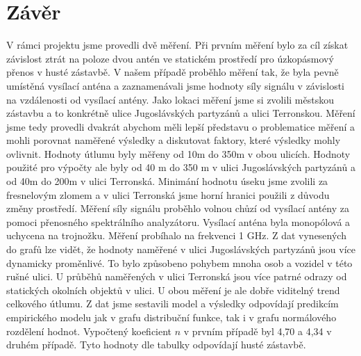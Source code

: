 \chapter*{Závěr} %
V rámci projektu jsme provedli dvě měření. Při prvním měření bylo za cíl získat závislost ztrát na poloze dvou antén ve statickém prostředí pro úzkopásmový přenos v husté zástavbě. V našem případě proběhlo měření tak, že byla pevně umístěná vysílací anténa a zaznamenávali jsme hodnoty síly signálu v závislosti na vzdálenosti od vysílací antény. Jako lokaci měření jsme si zvolili městskou zástavbu a to konkrétně ulice Jugoslávských partyzánů a ulici Terronskou. Měření jsme tedy provedli dvakrát abychom měli lepší představu o problematice měření a mohli porovnat naměřené výsledky a diskutovat faktory, které výsledky mohly ovlivnit.
Hodnoty útlumu byly měřeny od 10m do 350m v obou ulicích. Hodnoty použité pro výpočty ale byly od 40 m do 350 m v ulici Jugoslávských partyzánů a od 40m do 200m v ulici Terronská. Minimání hodnotu úseku jsme zvolili za fresnelovým zlomem a v ulici Terronská jsme horní hranici použili z důvodu změny prostředí. Měření síly signálu proběhlo volnou chůzí od vysílací antény za pomoci přenosného spektrálního analyzátoru. Vysílací anténa byla monopólová a uchycena na trojnožku. Měření probíhalo na frekvenci 1 GHz. 
Z dat vynesených do grafů lze vidět, že hodnoty naměřené v ulici Jugoslávských partyzánů jsou více dynamicky proměnlivé. To bylo způsobeno pohybem mnoha osob a vozidel v této rušné ulici. U průběhů naměřených v ulici Terronská jsou více patrné odrazy od statických okolních objektů v ulici. U obou měření je ale dobře viditelný trend celkového útlumu. Z dat jsme sestavili model a výsledky odpovídají predikcím empirického modelu jak v grafu distribuční funkce, tak i v grafu normálového rozdělení hodnot. Vypočtený koeficient $n$ v prvním případě byl 4,70 a 4,34 v druhém případě. Tyto hodnoty dle tabulky odpovídají husté zástavbě.

